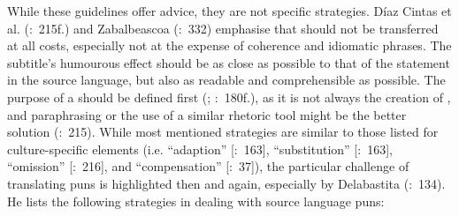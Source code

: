 While these guidelines offer advice, they are not specific strategies. Díaz Cintas et al. (\citealt{Diaz_cintas2007b}:~215f.) and Zabalbeascoa (\citeyear{Zabalbeascoa1996}:~332) emphasise that  should not be transferred at all costs, especially not at the expense of coherence and idiomatic phrases. The subtitle’s humourous effect should be as close as possible to that of the statement in the source language, but also as readable and comprehensible as possible. The purpose of a  should be defined first (\citealt{reis1984}; \citealt{stolze1997}:~180f.), as it is not always the creation of , and paraphrasing or the use of a similar rhetoric tool might be the better solution (\citealt{Diaz_cintas2007b}:~215). While most mentioned strategies are similar to those listed for culture-specific elements (i.e. “adaption” [\citealt{Veiga2009}:~163], “substitution” [\citealt{Veiga2009}:~163], “omission” [\citealt{Diaz_cintas2007}:~216], and “compensation” [\citealt{seifferth2009}:~37]), the particular challenge of translating puns is highlighted then and again, especially by Delabastita (\citeyear{Delabastita1996}:~134). He lists the following strategies in dealing with source language puns:

